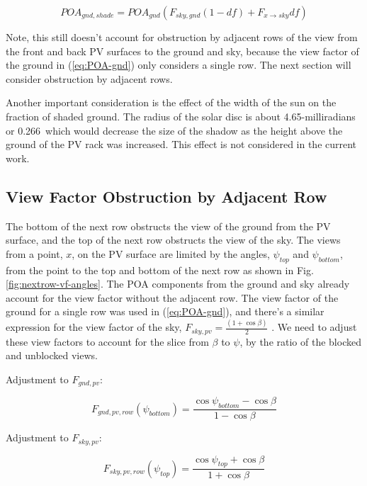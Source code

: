 \documentclass[conference]{IEEEtran}
\begin{document}
\begin{equation}
POA_{gnd,shade} = POA_{gnd}\left(F_{sky,gnd} \left(1-df \right) + F_{x \rightarrow sky} df\right)
\label{eq:POA-gnd-shade}
\end{equation}

Note, this still doesn't account for obstruction by adjacent rows of the view from the front and back PV surfaces to the ground and sky, because the view factor of the ground in (\ref{eq:POA-gnd}) only considers a single row. The next section will consider obstruction by adjacent rows.

Another important consideration is the effect of the width of the sun on the fraction of shaded ground. The radius of the solar disc is about 4.65-milliradians or 0.266\degree\ which would decrease the size of the shadow as the height above the ground of the PV rack was increased. This effect is not considered in the current work.

\subsection{View Factor Obstruction by Adjacent Row}
The bottom of the next row obstructs the view of the ground from the PV surface, and the top of the next row obstructs the view of the sky.  The views from a point, $x$, on the PV surface are limited by the angles, $\psi_{top}$ and $\psi_{bottom}$, from the point to the top and bottom of the next row as shown in Fig. \ref{fig:nextrow-vf-angles}.  The POA components from the ground and sky already account for the view factor without the adjacent row.  The view factor of the ground for a single row was used in (\ref{eq:POA-gnd}), and there's a similar expression for the view factor of the sky, $F_{sky,pv}=\frac{\left(1+\cos\beta\right)}{2}$ \cite{Marion2017}. We need to adjust these view factors to account for the slice from $\beta$ to $\psi$, by the ratio of the blocked and unblocked views.

Adjustment to $F_{gnd,pv}$:

\begin{equation}
F_{gnd,pv,row}\left(\psi_{bottom} \right) = \frac{\cos \psi_{bottom} - \cos \beta}{1-\cos\beta}
\end{equation}

Adjustment to $F_{sky,pv}$:

\begin{equation}
F_{sky,pv,row}\left(\psi_{top} \right) = \frac{\cos \psi_{top} + \cos \beta}{1+\cos\beta}
\end{equation}
\end{document}
